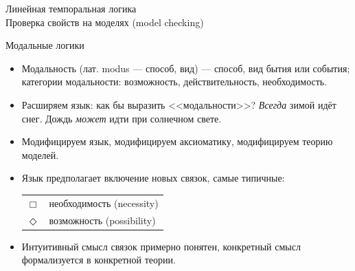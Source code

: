 \documentclass[aspectratio=169,dvipsnames,usenames]{beamer}
\begin{document}
\newtheorem{dfn}{Определение}[section]
\newtheorem{nte}{Замечание}[section]

\newtheorem{axiom}{Аксиома}[section]
\newtheorem{thm}{Теорема}[section]
\newtheorem{lmm}[theorem]{Лемма}
\newtheorem{statement}{Утверждение}[section]
\newtheorem{oun_paragraph}{Пункт}[section]
\newtheorem{cons}{Следствие}[section]
\newtheorem*{exm}{Пример}

\newcommand{\comb}[1]{\operatorname{\mathcal{#1}}}
\newcommand{\func}[1]{\operatorname{#1}}
\newcommand{\reduction}[1]{{\color{OrangeRed}#1}}
\newcommand{\set}[1]{\left\{#1\right\}}

\def\from#1{\par \parbox{0.7\textwidth}{\par \hfill\raggedleft \it #1}} 

\begin{frame}{}
\begin{center}
{\LARGE Линейная темпоральная логика\\Проверка свойств на моделях (model checking)}
\end{center}
\end{frame}

\begin{frame}{Модальные логики}
\begin{itemize}
\item Модальность (лат. modus — способ, вид) — способ, вид бытия или события; 
категории модальности: возможность, действительность, необходимость.

\item Расширяем язык: как бы выразить <<модальности>>?
\emph{Всегда} зимой идёт снег. Дождь \emph{может} идти при солнечном свете.

\item Модифицируем язык, модифицируем аксиоматику, модифицируем теорию моделей.
\item Язык предполагает включение новых связок, самые типичные:
\begin{tabular}{ll}
$\Box$ & необходимость (necessity)\\
$\Diamond$ & возможность (possibility)
\end{tabular}

\item Интуитивный смысл связок примерно понятен, конкретный смысл формализуется
в конкретной теории.

\end{itemize}
\end{frame}
\end{document}

